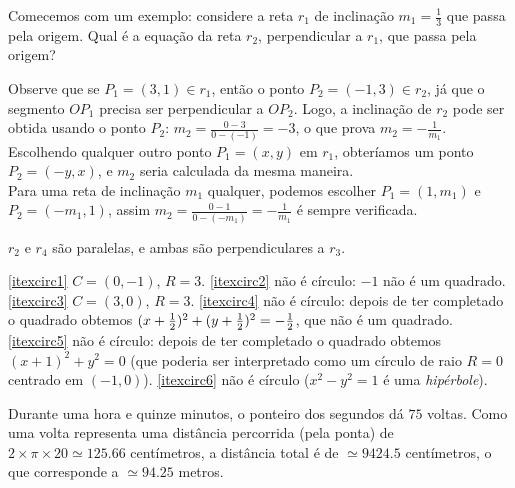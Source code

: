 \begin{Solution}{1.16}
 Comecemos com um exemplo: considere a reta $r_1$ de inclinação $m_1=\tfrac13$
que passa pela origem. Qual é a equação da reta $r_2$, perpendicular a $r_1$, que passa
pela origem?
\begin{center}
 \begin{bmlimage}\end{bmlimage}
\end{center}
 Observe que se $P_1=(3,1)\in r_1$, então o ponto $P_2=(-1,3)\in r_2$, já que o segmento
$OP_1$ precisa ser perpendicular a $OP_2$. Logo, a inclinação de $r_2$ pode ser obtida
usando o ponto $P_2$:
$m_2=\frac{0-3}{0-(-1)}=-3$,
 o que prova $m_2=-\frac{1}{m_1}$. Escolhendo qualquer outro ponto $P_1=(x,y)$ em $r_1$,
obteríamos um ponto $P_2=(-y,x)$, e $m_2$ seria calculada da mesma maneira.\\

 Para uma reta de inclinação $m_1$ qualquer, podemos escolher $P_1=(1,m_1)$ e
$P_2=(-m_1,1)$, assim $m_2=\frac{0-1}{0-(-m_1)}=-\frac{1}{m_1}$ é sempre verificada.
\end{Solution}
\begin{Solution}{1.17}
$r_2$ e $r_4$ são paralelas, e ambas são perpendiculares a $r_3$.
\end{Solution}
\begin{Solution}{1.18}
\eqref{itexcirc1} $C=(0,-1)$, $R=3$.
\eqref{itexcirc2} não é círculo: $-1$ não é um quadrado.
\eqref{itexcirc3} $C=(3,0)$, $R=3$.
 \eqref{itexcirc4} não é círculo: depois de ter completado o quadrado obtemos
$(x+\frac{1}{2})^2+(y+\frac{1}{2})^2=-\frac{1}{2}$, que não é um quadrado.
 \eqref{itexcirc5} não é círculo: depois de ter completado o quadrado obtemos
$(x+1)^2+y^2=0$ (que poderia ser interpretado como um círculo de raio $R=0$ centrado em
$(-1,0)$).
\eqref{itexcirc6} não é círculo ($x^2-y^2=1$ é
uma \emph{hipérbole}).
\end{Solution}
\begin{Solution}{1.19}
 Durante uma hora e quinze minutos, o ponteiro dos segundos
dá $75$ voltas.
Como uma volta representa uma distância percorrida (pela ponta) de
$2\times \pi\times
20\simeq 125.66$ centímetros, a distância total é de $\simeq 9424.5$
centímetros, o que corresponde a $\simeq 94.25$ metros.
\end{Solution}
